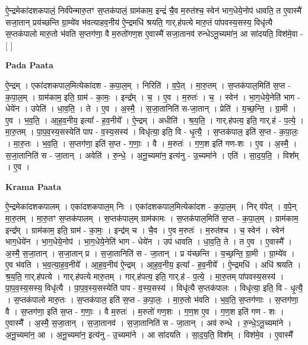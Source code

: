 \documentclass[17pt]{extarticle}
\begin{document}
ऐ॒न्द्रमेका॑दशकपालं॒ निर्व॑पेन्मारु॒तꣳ स॒प्तक॑पालं॒ ग्राम॑काम॒ इन्द्रं॑ चै॒व म॒रुत॑श्च॒ स्वेन॑ भाग॒धेये॒नोप॑ धावति॒ त ए॒वास्मै॑ सजा॒तान् प्रय॑च्छन्ति ग्रा॒म्ये॑व भ॑वत्याहव॒नीय॑ ऐ॒न्द्रमधि॑ श्रयति॒ गार्.ह॑पत्ये मारु॒तं पा॑पवस्य॒सस्य॒ विधृ॑त्यै स॒प्तक॑पालो मारु॒तो भ॑वति स॒प्तग॑णा॒ वै म॒रुतो॑गण॒श ए॒वास्मै॑ सजा॒तानव॑ रुन्धेऽनू॒च्यमा॑न॒ आ सा॑दयति॒ विश॑मे॒वा - [  ] \newline

\textbf{Pada Paata} \newline

ऐ॒न्द्रम् । एका॑दशकपाल॒मित्येका॑दश - क॒पा॒ल॒म् । निरिति॑ । व॒पे॒त् । मा॒रु॒तम् । स॒प्तक॑पाल॒मिति॑ स॒प्त - क॒पा॒ल॒म् । ग्राम॑काम॒ इति॒ ग्राम॑ - का॒मः॒ । इन्द्र᳚म् । च॒ । ए॒व । म॒रुतः॑ । च॒ । स्वेन॑ । भा॒ग॒धेये॒नेति॑ भाग - धेये॑न । उपेति॑ । धा॒व॒ति॒ । ते । ए॒व । अ॒स्मै॒ । स॒जा॒तानिति॑ स-जा॒तान् । प्रेति॑ । य॒च्छ॒न्ति॒ । ग्रा॒मी । ए॒व । भ॒व॒ति॒ । आ॒ह॒व॒नीय॒ इत्या᳚ - ह॒व॒नीये᳚ । ऐ॒न्द्रम् । अधीति॑ । श्र॒य॒ति॒ । गार्.ह॑पत्य॒ इति॒ गार्.ह॑ - प॒त्ये॒ । मा॒रु॒तम् । पा॒प॒व॒स्य॒सस्येति॑ पाप - व॒स्य॒सस्य॑ । विधृ॑त्या॒ इति॒ वि - धृ॒त्यै॒ । स॒प्तक॑पाल॒ इति॑ स॒प्त - क॒पा॒लः॒ । मा॒रु॒तः । भ॒व॒ति॒ । स॒प्तग॑णा॒ इति॑ स॒प्त - ग॒णाः॒ । वै । म॒रुतः॑ । ग॒ण॒श इति॑ गण-शः । ए॒व । अ॒स्मै॒ । स॒जा॒तानिति॑ स - जा॒तान् । अवेति॑ । रु॒न्धे॒ । अ॒नू॒च्यमा॑न॒ इत्य॑नु - उ॒च्यमा॑ने । एति॑ । सा॒द॒य॒ति॒ । विश᳚म् । ए॒व ।  \newline


\textbf{Krama Paata} \newline

ऐ॒न्द्रमेका॑दशकपालम् । एका॑दशकपाल॒म् निः । एका॑दशकपाल॒मित्येका॑दश - क॒पा॒ल॒म् । निर् व॑पेत् । व॒पे॒न् मा॒रु॒तम् । मा॒रु॒तꣳ स॒प्तक॑पालम् । स॒प्तक॑पाल॒म् ग्राम॑कामः । स॒प्तक॑पाल॒मिति॑ स॒प्त - क॒पा॒ल॒म् । ग्राम॑काम॒ इन्द्र᳚म् । ग्राम॑काम॒ इति॒ ग्राम॑ - का॒मः॒ । इन्द्र॑म् च । चै॒व । ए॒व म॒रुतः॑ । म॒रुत॑श्च । च॒ स्वेन॑ । स्वेन॑ भाग॒धेये॑न । भा॒ग॒धेये॒नोप॑ । भा॒ग॒धेये॒नेति॑ भाग - धेये॑न । उप॑ धावति । धा॒व॒ति॒ ते । त ए॒व । ए॒वास्मै᳚ । अ॒स्मै॒ स॒जा॒तान् । स॒जा॒तान् प्र । स॒जा॒तानिति॑ स - जा॒तान् । प्र य॑च्छन्ति । य॒च्छ॒न्ति॒ ग्रा॒मी । ग्रा॒म्ये॑व । ए॒व भ॑वति । भ॒व॒त्या॒ह॒व॒नीये᳚ । आ॒ह॒व॒नीय॑ ऐ॒न्द्रम् । आ॒ह॒व॒नीय॒ इत्या᳚ - ह॒व॒नीये᳚ । ऐ॒न्द्रमधि॑ । अधि॑ श्रयति । श्र॒य॒ति॒ गार्.ह॑पत्ये । गार्.ह॑पत्ये मारु॒तम् । गार्.ह॑पत्य॒ इति॒ गार्.ह॑ - प॒त्ये॒ । मा॒रु॒तम् पा॑पवस्य॒सस्य॑ । पा॒प॒व॒स्य॒सस्य॒ विधृ॑त्यै । पा॒प॒व॒स्य॒सस्येति॑ पाप - व॒स्य॒सस्य॑ । विधृ॑त्यै स॒प्तक॑पालः । विधृ॑त्या॒ इति॒ वि - धृ॒त्यै॒ । स॒प्तक॑पालो मारु॒तः । स॒प्तक॑पाल॒ इति॑ स॒प्त - क॒पा॒लः॒ । मा॒रु॒तो भ॑वति । भ॒व॒ति॒ स॒प्तग॑णाः । स॒प्तग॑णा॒ वै । स॒प्तग॑णा॒ इति॑ स॒प्त - ग॒णाः॒ । वै म॒रुतः॑ । म॒रुतो॑ गण॒शः । ग॒ण॒श ए॒व । ग॒ण॒श इति॑ गण - शः । ए॒वास्मै᳚ । अ॒स्मै॒ स॒जा॒तान् । स॒जा॒तानव॑ । स॒जा॒तानिति॑ स - जा॒तान् । अव॑ रुन्धे । रु॒न्धे॒ऽनू॒च्यमा॑ने । अ॒नू॒च्यमा॑न॒ आ । अ॒नू॒च्यमा॑न॒ इत्य॑नु - उ॒च्यमा॑ने । आ सा॑दयति । सा॒द॒य॒ति॒ विश᳚म् । विश॑मे॒व । ए॒वास्मै᳚ \newline
\end{document}
